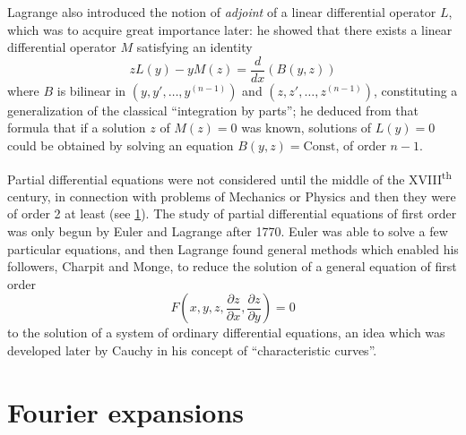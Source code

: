 \documentclass[12pt,a4paper,leqno,twoside]{extbook}
\newcommand{\supth}{\texorpdfstring{\textsuperscript{th}}{th}}
\newcommand{\pder}[2]{\frac{\partial #1}{\partial #2}}
\begin{document}
Lagrange also introduced \cite[vol.~I, p.~471]{135} the notion of \emph{adjoint} of a linear differential operator \(L\), which was to acquire great importance later: he showed that there exists a linear differential operator \(M\) satisfying an identity
\begin{equation}
    \label{eq:1.5}
    z L(y) - y M(z) = \frac{d}{dx}\left(B(y, z)\right)
\end{equation}
where \(B\) is bilinear in \((y, y', \ldots, y^{(n-1)})\) and \((z, z', \ldots, z^{(n-1)})\), constituting a generalization of the classical ``integration by parts''; he deduced from that formula that if a solution \(z\) of \(M(z) = 0\) was known, solutions of \(L(y) = 0\) could be obtained by solving an equation \(B(y,z) = \text{Const}\), of order \(n-1\).

Partial differential equations were not considered until the middle of the XVIII\supth{} century, in connection with problems of Mechanics or Physics and then they were of order 2 at least (see \ref{sec:1.2}). The study of partial differential equations of first order was only begun by Euler and Lagrange after 1770. Euler was able to solve a few particular equations, and then Lagrange found general methods which enabled his followers, Charpit and Monge, to reduce the solution of a general equation of first order
\begin{equation}
    \label{eq:1.6}
    F\left(x,y,z, \pder{z}{x}, \pder{z}{y}\right) = 0
\end{equation}
to the solution of a system of ordinary differential equations, an idea which was developed later by Cauchy in his concept of ``characteristic curves''.

\section{Fourier expansions}
\label{sec:1.2}
\end{document}

